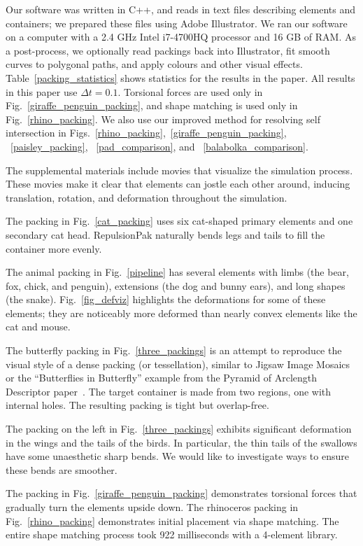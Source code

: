 Our software was written in C++, and reads in text files describing
elements and containers; we prepared these files using
Adobe Illustrator.  We ran
our software on a computer with a 2.4 GHz Intel i7-4700HQ processor
and 16 GB of RAM.  As a post-process, we optionally read packings
back into Illustrator, fit smooth curves to polygonal paths, and
apply colours and other visual effects.  Table~\ref{packing_statistics}
shows statistics for the results in the paper.  All results in this
paper use $\Delta t = 0.1$.
Torsional forces are used only in Fig.~\ref{giraffe_penguin_packing},
and shape matching is used only in Fig.~\ref{rhino_packing}.
We also use our improved method for resolving self intersection in
Figs.~\ref{rhino_packing},~\ref{giraffe_penguin_packing},
~\ref{paisley_packing},
~\ref{pad_comparison}, and
~\ref{balabolka_comparison}.

The supplemental materials include movies that visualize the simulation
process.  These movies make it clear that elements can jostle each other
around, inducing translation, rotation, and deformation throughout the 
simulation.

The packing in Fig.~\ref{cat_packing} 
uses six cat-shaped primary elements and one secondary cat head.
RepulsionPak naturally bends legs and tails to fill the container more evenly.

The animal packing in Fig.~\ref{pipeline} 
has several elements with limbs (the bear, fox, chick, and penguin),  
extensions (the dog and bunny ears), and long shapes (the snake).
Fig.~\ref{fig_defviz} highlights the deformations for some of these elements;
they are noticeably more deformed 
than nearly convex elements like the cat and mouse.


The butterfly packing in Fig.~\ref{three_packings} is an attempt to reproduce 
the visual style of a 
dense packing (or tessellation), similar to Jigsaw Image Mosaics~\cite{Kim2002}
or the ``Butterflies in Butterfly'' example from the
Pyramid of Arclength Descriptor paper~\cite[Fig. 21]{Kwan2016}. 
The target container is made from two regions,
one with internal holes.  The resulting packing is tight but overlap-free.

The packing on the left in Fig.~\ref{three_packings}
exhibits significant deformation in the wings and the tails of the birds.
In particular, the thin tails of the swallows have some unaesthetic
sharp bends.  We would like to investigate ways to ensure these bends are
smoother.

The packing in Fig.~\ref{giraffe_penguin_packing} demonstrates torsional forces
that gradually turn the elements upside down. 
The rhinoceros packing in Fig.~\ref{rhino_packing} demonstrates initial placement via shape matching.
The entire shape matching process took 922 milliseconds with a 4-element library.

